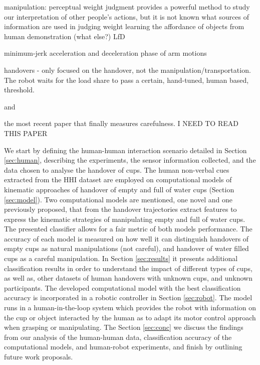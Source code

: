 manipulation:
\cite{hamilton_kinematic_2007} perceptual weight judgment provides a powerful method to study our interpretation of other people's actions, but it is not known what sources of information are used in judging weight
\cite{kjellstrom_visual_2011} learning the affordance of objects from human demonstration (what else?)
\cite{santina_learning_2019} LfD

minimum-jerk acceleration and deceleration phase of arm motions \cite{fligge_minimum_2012}

handovers - 
\cite{Medina2016} only focused on the handover, not the manipulation/transportation. The robot waits for the load share to pass a certain, hand-tuned, human based, threshold.

\cite{hansen_humanhuman_2017} and \cite{kato_where_2019}

\cite{lastrico_careful_2021} the most recent paper that finally measures carefulness. I NEED TO READ THIS PAPER

We start by defining the human-human interaction scenario detailed in Section \ref{sec:human}, describing the experiments, the sensor information collected, and the data chosen to analyse the handover of cups. The human non-verbal cues extracted from the HHI dataset are employed on computational models of kinematic approaches of handover of empty and full of water cups (Section \ref{sec:model}). Two computational models are mentioned, one novel and one previously proposed, that from the handover trajectories extract features to express the kinematic strategies of manipulating empty and full of water cups. The presented classifier allows for a fair metric of both models performance. The accuracy of each model is measured on how well it can distinguish handovers of empty cups as natural manipulations (not careful), and handover of water filled cups as a careful manipulation. In Section \ref{sec:results} it presents additional classification results in order to understand the impact of different types of cups, as well as, other datasets of human handovers with unknown cups, and unknown participants. The developed computational model with the best classification accuracy is incorporated in a robotic controller in Section \ref{sec:robot}. The model runs in a human-in-the-loop system which provides the robot with information on the cup or object interacted by the human as to adapt its motor control approach when grasping or manipulating. The Section \ref{sec:conc} we discuss the findings from our analysis of the human-human data, classification accuracy of the computational models, and human-robot experiments, and finish by outlining future work proposals.  

